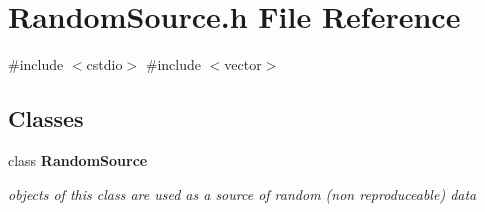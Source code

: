 \section{Random\+Source.\+h File Reference}
\label{RandomSource_8h}
{\ttfamily \#include $<$cstdio$>$}\newline
{\ttfamily \#include $<$vector$>$}\newline
\subsection*{Classes}
\begin{DoxyCompactItemize}
\item 
class \textbf{ Random\+Source}
\begin{DoxyCompactList}\small\item\em objects of this class are used as a source of random (non reproduceable) data \end{DoxyCompactList}\end{DoxyCompactItemize}
